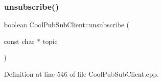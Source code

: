 \mbox{\label{class_cool_pub_sub_client_a850554280e314d6b5c33c73fd9e809fc}} 
\subsubsection{\texorpdfstring{unsubscribe()}{unsubscribe()}}
{\footnotesize\ttfamily boolean Cool\+Pub\+Sub\+Client\+::unsubscribe (\begin{DoxyParamCaption}\item[{const char $\ast$}]{topic }\end{DoxyParamCaption})}



Definition at line 546 of file Cool\+Pub\+Sub\+Client.\+cpp.


